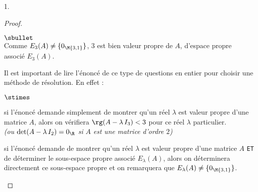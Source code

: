 \documentclass[11pt]{article}%
\begin{document}
\begin{noliste}{1.}
\begin{proof}
\begin{noliste}{$\sbullet$}
\[   \]  
   Comme $E_3(A) \neq \{0_{\M{3,1}}\}$, $3$ est bien valeur propre de
   $A$, d'espace propre associé $E_3(A)$.%
   \begin{remark}
     Il est important de lire l'énoncé de ce type de questions en entier 
     pour choisir une méthode de résolution. En effet :
     \begin{noliste}{$\stimes$}
     \item si l'énoncé demande simplement de montrer qu'un réel
       $\lambda$ est valeur propre d'une matrice $A$, alors on
       vérifiera $\rg(A-\lambda \, I_3) < 3$ pour ce réel $\lambda$
       particulier.\\
       \textit{(ou $\det(A-\lambda \, I_2)=0_{\R}$ si $A$ est une
         matrice d'ordre $2$)}
     \item si l'énoncé demande de montrer qu'un réel $\lambda$ est
       valeur propre d'une matrice $A$ {\tt ET} de déterminer le
       sous-espace propre associé $E_\lambda(A)$, alors on déterminera
       directement ce sous-espace propre et on remarquera que
       $E_\lambda(A) \neq \{0_{\M{3,1}}\}$.
     \end{noliste}
   \end{remark}
  

   \newpage



\end{noliste}
\end{proof}
\end{noliste}
\end{document}
